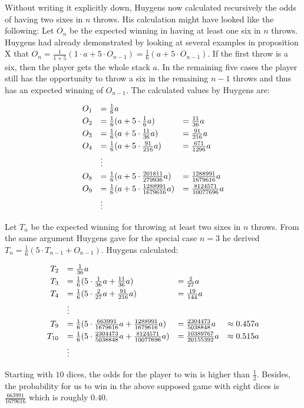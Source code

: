 Without writing it explicitly down, Huygens now calculated recursively the odds of having two sixes in $n$ throws. His calculation might have looked like the following: Let $O_n$ be the expected winning in having at least one six in $n$ throws. Huygens had already demonstrated by looking at several examples in proposition X that $O_n = \tfrac 1{1+5} \left( 1 \cdot a + 5 \cdot O_{n-1} \right)=\tfrac 16 \left( a + 5 \cdot O_{n-1} \right)$. If the first throw is a six, then the player gets the whole stack $a$. In the remaining five cases the player still has the opportunity to throw a six in the remaining $n-1$ throws and thus has an expected winning of $O_{n-1}$. The calculated values by Huygens are:

\begin{align}
  \begin{array}{rll}
    O_1 & = \frac 16 a \nl
    O_2 & = \frac 16 ( a + 5 \cdot \frac 16 a) & = \frac{11}{36} a \nl
    O_3 & = \frac 16 ( a + 5 \cdot \frac{11}{36} a) & = \frac{91}{216} a \nl
    O_4 & = \frac 16 ( a + 5 \cdot \frac{91}{216} a) & = \frac{671}{1296} a \nl
    & \vdots \nl
    O_8 & = \frac 16 ( a + 5 \cdot \frac{201811}{279936} a) & = \frac{1288991}{1679616} a \nl
    O_9 & = \frac 16 ( a + 5 \cdot \frac{1288991}{1679616} a) & = \frac{8124571}{10077696} a \nl
    & \vdots
  \end{array}
\end{align}

Let $T_n$ be the expected winning for throwing at least two sixes in $n$ throws. From the same argument Huygens gave for the special case $n=3$ he derived $T_n = \tfrac{1}{6} ( 5 \cdot T_{n-1}  + O_{n-1})$. Huygens calculated:

\begin{align}
  \begin{array}{rlll}
    T_2 & = \frac 1{36} a \nl
    T_3 & = \frac 16 (5 \cdot \frac 1{36} a + \frac{11}{36} a) &= \frac 2{27} a \nl
    T_4 & = \frac 16 (5 \cdot \frac 2{27} a + \frac{91}{216} a) &= \frac {19}{144} a \nl
    & \vdots \nl
    T_9 & = \frac 16 (5 \cdot \frac {663991}{1679616} a + \frac{1288991}{1679616} a) &= \frac {2304473}{5038848} a & \approx 0.457 a \nl
    T_{10} & = \frac 16 (5 \cdot \frac{2304473}{5038848} a + \frac{8124571}{10077696} a) &= \frac{10389767}{20155392} a & \approx 0.515 a \nl
    & \vdots 
  \end{array}
\end{align}

Starting with $10$ dices, the odds for the player to win is higher than $\tfrac 12$. Besides, the probability for us to win in the above supposed game with eight dices is $\tfrac{663991}{1679616}$ which is roughly $0.40$.

